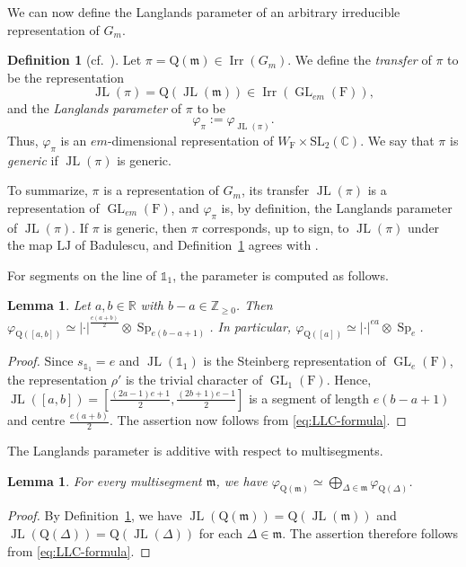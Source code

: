 \documentclass[11pt]{amsart}
\numberwithin{equation}{section}
\theoremstyle{plain}
\newtheorem{lemma}[theorem]{Lemma}
\theoremstyle{definition}
\newtheorem{definition}[theorem]{Definition}
\theoremstyle{remark}
\newcommand{\R}{\mathbb{R}}
\newcommand{\C}{\mathbb{C}}
\newcommand{\Z}{\mathbb{Z}}
\newcommand{\one}{\mathds{1}}
\DeclareMathOperator{\GL}{GL}
\DeclareMathOperator{\Irr}{Irr}
\DeclareMathOperator{\Sp}{Sp}
\DeclareMathOperator{\JL}{JL}
\newcommand{\mm}{\mathfrak{m}}
\newcommand{\Qq}{\mathrm{Q}}
\begin{document}
We can now define the Langlands parameter of an arbitrary irreducible representation of $G_m$.

\begin{definition}[{cf.~\cite[Definition 2.1]{ALMSY24}}]\label{def:L-param}
	Let $\pi=\Qq(\mm)\in\Irr(G_m)$. We define the \emph{transfer} of $\pi$ to be the representation
	$$
	\JL(\pi)=\Qq(\JL(\mm))\in\Irr(\GL_{em}(\mathrm{F})),
	$$
	and the \emph{Langlands parameter} of $\pi$ to be
	$$
	\varphi_\pi:=\varphi_{\JL(\pi)}.
	$$
	Thus, $\varphi_\pi$ is an $em$-dimensional representation of $W_{\mathrm{F}}\times\mathrm{SL}_2(\C)$. We say that $\pi$ is \emph{generic} if $\JL(\pi)$ is generic.
\end{definition}

To summarize, $\pi$ is a representation of $G_m$, its transfer $\JL(\pi)$ is a representation of $\GL_{em}(\mathrm{F})$, and $\varphi_\pi$ is, by definition, the Langlands parameter of $\JL(\pi)$. If $\pi$ is generic, then $\pi$ corresponds, up to sign, to $\JL(\pi)$ under the map $\mathrm{LJ}$ of Badulescu, and Definition~\ref{def:L-param} agrees with \cite[Definition 2.1]{ALMSY24}.

For segments on the line of $\one_1$, the parameter is computed as follows.

\begin{lemma}\label{lem:L-segment}
	Let $a,b\in\R$ with $b-a\in\Z_{\ge0}$. Then $\varphi_{\Qq([a,b])}\simeq|\cdot|^{\frac{e(a+b)}2}\otimes\Sp_{e(b-a+1)}$. In particular, $\varphi_{\Qq([a])}\simeq|\cdot|^{ea}\otimes\Sp_e$.
\end{lemma}

\begin{proof}
	Since $s_{\one_1}=e$ and $\JL(\one_1)$ is the Steinberg representation of $\GL_e(\mathrm{F})$, the representation $\rho'$ is the trivial character of $\GL_1(\mathrm{F})$. Hence, $\JL([a,b])=[\frac{(2a-1)e+1}2,\frac{(2b+1)e-1}2]$ is a segment of length $e(b-a+1)$ and centre $\frac{e(a+b)}2$. The assertion now follows from \eqref{eq:LLC-formula}.
\end{proof}

The Langlands parameter is additive with respect to multisegments.

\begin{lemma}\label{lem:L-additive}
	For every multisegment $\mm$, we have $\varphi_{\Qq(\mm)}\simeq\bigoplus_{\Delta\in\mm}\varphi_{\Qq(\Delta)}$.
\end{lemma}

\begin{proof}
	By Definition~\ref{def:L-param}, we have $\JL(\Qq(\mm))=\Qq(\JL(\mm))$ and $\JL(\Qq(\Delta))=\Qq(\JL(\Delta))$ for each $\Delta\in\mm$. The assertion therefore follows from \eqref{eq:LLC-formula}.
\end{proof}
\end{document}

